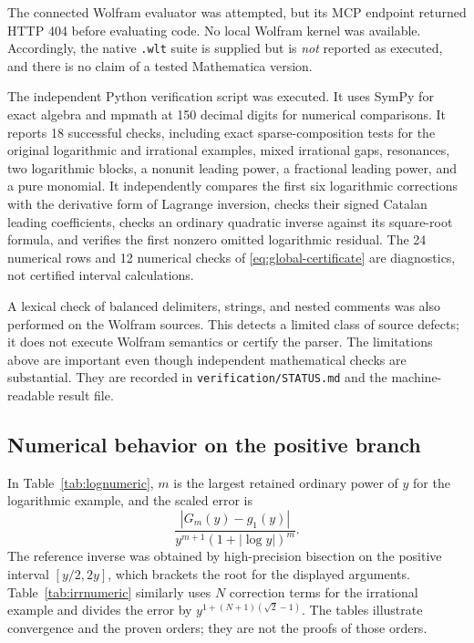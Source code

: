\documentclass[11pt,a4paper]{article}
\numberwithin{equation}{section}
\theoremstyle{definition}
\theoremstyle{remark}
\begin{document}
The connected Wolfram evaluator was attempted, but its MCP endpoint returned
HTTP 404 before evaluating code. No local Wolfram kernel was available.
Accordingly, the native \texttt{.wlt} suite is supplied but is \emph{not}
reported as executed, and there is no claim of a tested Mathematica version.

The independent Python verification script was executed. It uses SymPy for
exact algebra and mpmath at 150 decimal digits for numerical comparisons.
It reports 18 successful checks, including exact sparse-composition tests
for the original logarithmic and irrational examples, mixed irrational gaps,
resonances, two logarithmic blocks, a nonunit leading power, a fractional
leading power, and a pure monomial. It independently compares the first
six logarithmic corrections with the derivative form of Lagrange inversion,
checks their signed Catalan leading coefficients, checks an ordinary
quadratic inverse against its square-root formula, and verifies the first
nonzero omitted logarithmic residual. The 24 numerical rows and 12 numerical
checks of \eqref{eq:global-certificate} are diagnostics, not certified
interval calculations.

A lexical check of balanced delimiters, strings, and nested comments was
also performed on the Wolfram sources. This detects a limited class of
source defects; it does not execute Wolfram semantics or certify the parser.
The limitations above are important even though independent mathematical
checks are substantial. They are recorded in
\texttt{verification/STATUS.md} and the machine-readable result file.

\subsection{Numerical behavior on the positive branch}

In Table~\ref{tab:lognumeric}, $m$ is the largest retained ordinary power
of $y$ for the logarithmic example, and the scaled error is
\[
 \frac{|G_m(y)-g_1(y)|}{y^{m+1}(1+|\log y|)^m}.
\]
The reference inverse was obtained by high-precision bisection on the
positive interval $[y/2,2y]$, which brackets the root for the displayed
arguments. Table~\ref{tab:irrnumeric} similarly uses $N$ correction terms
for the irrational example and divides the error by
$y^{1+(N+1)(\sqrt2-1)}$. The tables illustrate convergence and the proven
orders; they are not the proofs of those orders.



\end{document}
